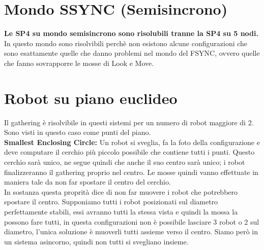 \section{Mondo SSYNC (Semisincrono)}
\textbf{ Le SP4 su mondo semisincrono sono risolubili tranne la SP4 su 5 nodi.}
In questo mondo sono risolvibili perchè non esistono alcune configurazioni che sono esattamente quelle che danno problemi nel mondo del FSYNC, ovvero quelle che fanno sovrapporre le mosse di Look e Move.\\
\section{Robot su piano euclideo}
Il gathering è risolvibile in questi sistemi per un numero di robot maggiore di 2. Sono visti in questo caso come punti del piano.\\ \textbf{Smallest Enclosing Circle:} Un robot si sveglia, fa la foto della configurazione e deve computare il cerchio più piccolo possibile che contiene tutti i punti. Questo cerchio sarà unico, ne segue quindi che anche il suo centro sarà unico; i robot finalizzeranno il gathering proprio nel centro. Le mosse quindi vanno effettuate in maniera tale da non far spostare il centro del cerchio.\\
In sostanza questa proprità dice di non far muovere i robot che potrebbero spostare il centro. Supponiamo tutti i robot posizionati sul diametro perfettamente stabili, essi avranno tutti la stessa vista e quindi la mossa la possono fare tutti, in questa configurazioni non è possibile lasciare 3 robot o 2 sul diametro, l'unica soluzione è muoverli tutti assieme verso il centro. Siamo però in un sistema asincorno, quindi non tutti si svegliano insieme.


